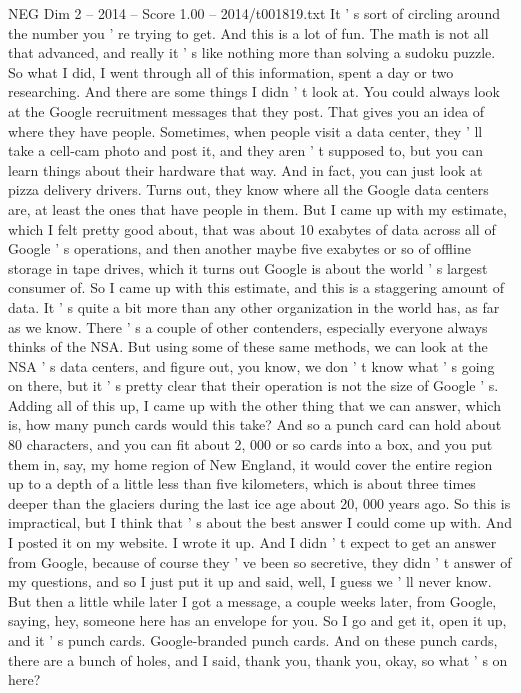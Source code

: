 \begin{textsample}{NEG Dim 2 – 2014 – Score 1.00 – 2014/t001819.txt}
It ' s sort of circling around the number you ' re trying to get.
And this is a lot of fun.
The math is not all that advanced, and really it ' s like nothing more than solving a sudoku puzzle.
So what I did, I went through all of this information, spent a day or two researching.
And there are some things I didn ' t look at.
You could always look at the Google recruitment messages that they post.
That gives you an idea of where they have people.
Sometimes, when people visit a data center, they ' ll take a cell-cam photo and post it, and they aren ' t supposed to, but you can learn things about their hardware that way.
And in fact, you can just look at pizza delivery drivers.
Turns out, they know where all the Google data centers are, at least the ones that have people in them.
But I came up with my estimate, which I felt pretty good about, that was about 10 exabytes of data across all of Google ' s operations, and then another maybe five exabytes or so of offline storage in tape drives, which it turns out Google is about the world ' s largest consumer of.
So I came up with this estimate, and this is a staggering amount of data.
It ' s quite a bit more than any other organization in the world has, as far as we know.
There ' s a couple of other contenders, especially everyone always thinks of the NSA.
But using some of these same methods, we can look at the NSA ' s data centers, and figure out, you know, we don ' t know what ' s going on there, but it ' s pretty clear that their operation is not the size of Google ' s.
Adding all of this up, I came up with the other thing that we can answer, which is, how many punch cards would this take?
And so a punch card can hold about 80 characters, and you can fit about 2, 000 or so cards into a box, and you put them in, say, my home region of New England, it would cover the entire region up to a depth of a little less than five kilometers, which is about three times deeper than the glaciers during the last ice age about 20, 000 years ago.
So this is impractical, but I think that ' s about the best answer I could come up with.
And I posted it on my website.
I wrote it up.
And I didn ' t expect to get an answer from Google, because of course they ' ve been so secretive, they didn ' t answer of my questions, and so I just put it up and said, well, I guess we ' ll never know.
But then a little while later I got a message, a couple weeks later, from Google, saying, hey, someone here has an envelope for you.
So I go and get it, open it up, and it ' s punch cards.
Google-branded punch cards.
And on these punch cards, there are a bunch of holes, and I said, thank you, thank you, okay, so what ' s on here?

\end{textsample}
